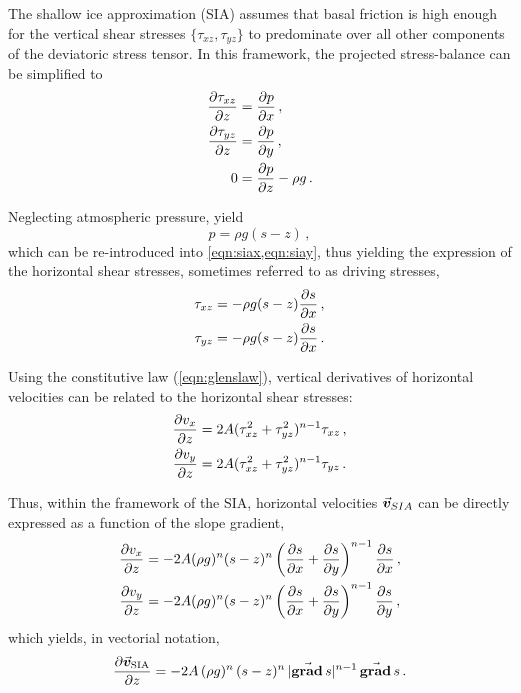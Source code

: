 \documentclass{article}
\newcommand{\vect}[1]{\va*{#1}} %
\renewcommand{\grad}[1]{\vect{\mathrm{grad}}\,#1}   %
\newcommand{\vv}[0]{\vect{v}}           %
\newcommand{\vsia}[0]{\vv_{\mathrm{SIA}}}   %
\begin{document}
The shallow ice approximation (SIA) assumes that basal friction is high enough
for the vertical shear stresses $\{\tau_{xz}, \tau_{yz}\}$ to predominate over
all other components of the deviatoric stress tensor. In this framework, the
projected stress-balance can be simplified to
\begin{subequations}
\label{eqn:sia}
\begin{align}
    \label{eqn:siax}
    \pdv{\tau_{xz}}{z} &= \pdv{p}{x} \,, \\
    \label{eqn:siay}
    \pdv{\tau_{yz}}{z} &= \pdv{p}{y} \,, \\
    \label{eqn:siaz}
    0 &= \pdv{p}{z} - \rho g \,.
\end{align}
\end{subequations}

Neglecting atmospheric pressure,  yield
\begin{equation}
    p = \rho g (s-z) \,,
\end{equation}
which can be re-introduced into \cref{eqn:siax,eqn:siay}, thus yielding the
expression of the horizontal shear stresses, sometimes referred to as driving
stresses,
\begin{subequations}
\begin{align}
    \tau_{xz} &= -\rho g (s-z) \pdv{s}{x} \,, \\
    \tau_{yz} &= -\rho g (s-z) \pdv{s}{x} \,.
\end{align}
\end{subequations}

Using the constitutive law (\ref{eqn:glenslaw}), vertical derivatives of
horizontal velocities can be related to the horizontal shear stresses:
\begin{subequations}
\begin{align}
    \pdv{v_x}{z} &= 2A (\tau_{xz}^2 + \tau_{yz}^2)^{n-1} \tau_{xz} \,, \\
    \pdv{v_y}{z} &= 2A (\tau_{xz}^2 + \tau_{yz}^2)^{n-1} \tau_{yz} \,.
\end{align}
\end{subequations}

Thus, within the framework of the SIA, horizontal velocities $\vv_{SIA}$ can be
directly expressed as a function of the slope gradient,
\begin{subequations}
\begin{align}
    \pdv{v_x}{z} &= -2A (\rho g)^n (s-z)^n
                    \left(\pdv{s}{x}+\pdv{s}{y}\right)^{n-1} \pdv{s}{x} \,, \\
    \pdv{v_y}{z} &= -2A (\rho g)^n (s-z)^n
                    \left(\pdv{s}{x}+\pdv{s}{y}\right)^{n-1} \pdv{s}{y} \,,
\end{align}
\end{subequations}
which yields, in vectorial notation,
\begin{equation}
    \label{eqn:vsia}
    \pdv{\vsia}{z} = -2A\,(\rho g)^n\,(s-z)^n\,|\grad{s}|^{n-1}\,\grad{s} \,.
\end{equation}
\end{document}
